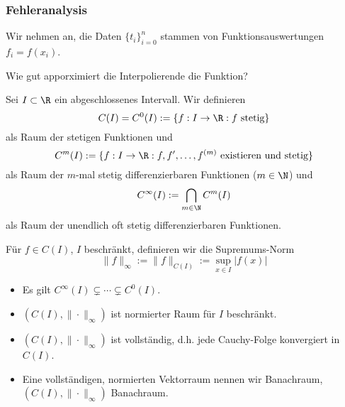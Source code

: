 \documentclass[11pt]{scrartcl}
\begin{document}
\subsubsection{Fehleranalysis}

Wir nehmen an, die Daten $\{t_i\}_{i=0}^n$ stammen von Funktionsauswertungen $f_i=f(x_i)$.

Wie gut apporximiert die Interpolierende die Funktion?

\begin{df}
	\label{1.9}
	Sei $I\subset \R$ ein abgeschlossenes Intervall.
	Wir definieren
	\[
		C(I) = C^0(I) := \{f: I\to \R : f \text{ stetig}\}
	\]
	als Raum der stetigen Funktionen und
	\[
		C^m(I) := \{f: I\to \R : f,f',\dotsc,f^{(m)} \text{ existieren und stetig}\}
	\]
	als Raum der $m$-mal stetig differenzierbaren Funktionen ($m\in \N$) und
	\[
		C^\infty(I) := \bigcap_{m\in \N}C^m (I)
	\]
	als Raum der unendlich oft stetig differenzierbaren Funktionen.

	Für $f\in C(I)$, $I$ beschränkt, definieren wir die Supremums-Norm
	\[
		\|f\|_\infty := \|f\|_{C(I)} := \sup_{x\in I}|f(x)|
	\]
\end{df}

\begin{note}
	\begin{itemize}
		\item 
			Es gilt $C^\infty(I) \subsetneq \dotsb \subsetneq C^0(I)$.
		\item
			$(C(I), \|\cdot\|_\infty)$ ist normierter Raum für $I$ beschränkt.
		\item
			$(C(I),\|\cdot\|_\infty)$ ist vollständig, d.h. jede Cauchy-Folge konvergiert in $C(I)$.
		\item
			Eine vollständigen, normierten Vektorraum nennen wir Banachraum, $(C(I),\|\cdot\|_\infty)$ Banachraum.
	\end{itemize}
\end{note}
\end{document}
